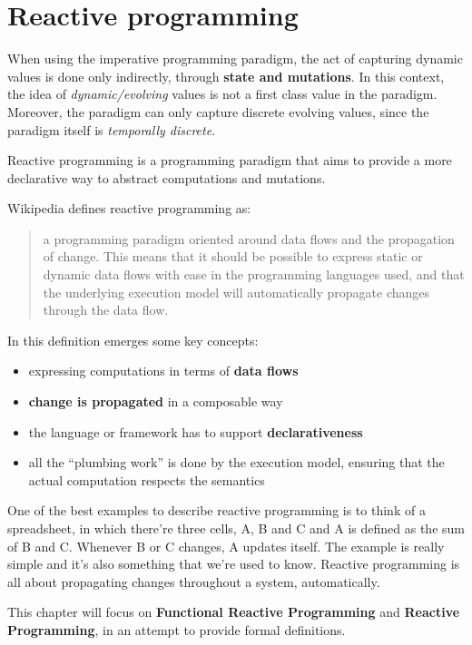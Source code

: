 \chapter{Reactive programming}\label{reactive-programming}

When using the imperative programming paradigm, the act of capturing
dynamic values is done only indirectly, through \textbf{state and
mutations}. In this context, the idea of \emph{dynamic/evolving} values
is not a first class value in the paradigm. Moreover, the paradigm can
only capture discrete evolving values, since the paradigm itself is
\emph{temporally discrete}.

Reactive programming is a programming paradigm that aims to provide a
more declarative way to abstract computations and mutations.

Wikipedia defines reactive programming as: 
\begin{quote} 
a programming paradigm oriented around data flows and the propagation of change. This
means that it should be possible to express static or dynamic data flows
with ease in the programming languages used, and that the underlying
execution model will automatically propagate changes through the data
flow.
\end{quote}

In this definition emerges some key concepts: 

\begin{itemize}
\itemsep1pt\parskip0pt
\item
  expressing computations in terms of \textbf{data flows} 
\item
  \textbf{change is propagated} in a composable way 
\item
  the language or framework has to support \textbf{declarativeness} 
\item
  all the ``plumbing work'' is done by the execution model, ensuring that the actual 
  computation respects the semantics

\end{itemize}

One of the best examples to describe reactive programming is to think of
a spreadsheet, in which there're three cells, A, B and C and A is
defined as the sum of B and C. Whenever B or C changes, A updates
itself. The example is really simple and it's also something that we're
used to know. Reactive programming is all about propagating changes
throughout a system, automatically.

This chapter will focus on \textbf{Functional Reactive Programming} and
\textbf{Reactive Programming}, in an attempt to provide formal
definitions.

